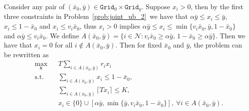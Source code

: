 \documentclass[mnsc,non-blindrev]{informs3}
\theoremstyle{definition}
\begin{document}
\begin{appendices}{\Large{}}
{Consider any pair of $(\bar{x}_0,\bar{y})\in \texttt{Grid}_0\times \texttt{Grid}_y$. Suppose $x_i>0$, then by the first three constraints in Problem~\eqref{prob:joint_ub_2}~we have that $\alpha\bar{y}\leq x_i\leq \bar{y}$, $x_i\leq 1-\bar{x}_0$ and $x_i\leq v_i\bar{x}_0$, thus $x_i>0$ implies $\alpha\bar{y}\leq x_i\leq \min\{v_i\bar{x}_0,\bar{y},1-\bar{x}_0\}$ and $\alpha\bar{y}\leq v_i\bar{x}_0$. We define $A(\bar{x}_0,\bar{y})=\{i\in\mathcal{N}:v_i\bar{x}_0\geq \alpha\bar{y},\,1-\bar{x}_0\geq \alpha\bar{y}\}$. Then we have that $x_i=0$ for all $i\notin A(\bar{x}_0,\bar{y})$. Then for fixed $\bar{x}_0$ and $\bar{y}$, the problem can be rewritten as
\begin{equation}\label{prob:joint_ub_4}
\begin{aligned}
&\max_{\bm{x}}&&T\sum_{i\in A(\bar{x}_0,\bar{y})}r_ix_i\\
&\text{s.t.}&&\sum_{i\in A(\bar{x}_0,\bar{y})} x_i\leq 1-\bar{x}_0,\\
&&&\sum_{i\in A(\bar{x}_0,\bar{y})}\lceil Tx_i\rceil\leq K,\\
&&&x_i\in\{0\}\cup[\alpha \bar{y},\min\{\bar{y},v_i\bar{x}_0,1-\bar{x}_0\}],\ \forall i\in A(\bar{x}_0,\bar{y}).
\end{aligned}
\end{equation}

}
\end{appendices}
\end{document}
